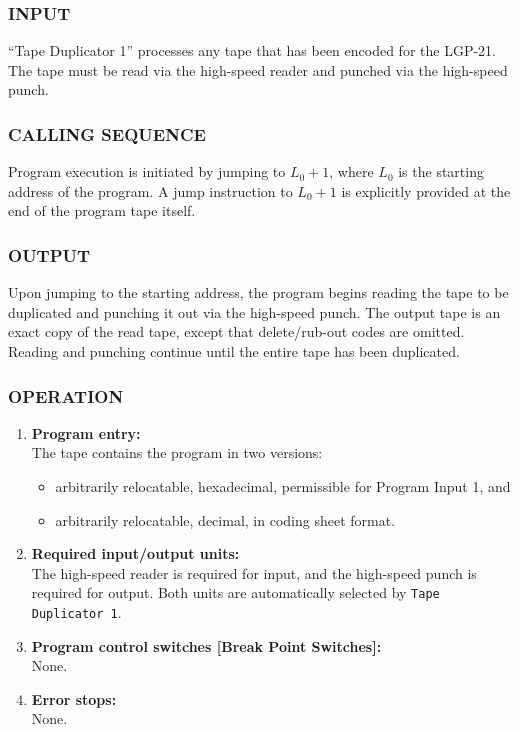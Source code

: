 \subsubsection*{INPUT}
``Tape Duplicator 1'' processes any tape that has been encoded for the LGP-21. The tape must be read via the high-speed reader and punched via the high-speed punch.

\subsubsection*{CALLING SEQUENCE}
Program execution is initiated by jumping to $L_0 + 1$, where $L_0$ is the starting address of the program. A jump instruction to $L_0 + 1$ is explicitly provided at the end of the program tape itself.

\subsubsection*{OUTPUT}
Upon jumping to the starting address, the program begins reading the tape to be duplicated and punching it out via the high-speed punch. The output tape is an exact copy of the read tape, except that delete/rub-out codes are omitted. Reading and punching continue until the entire tape has been duplicated.

\subsubsection*{OPERATION}
\begin{enumerate}
    \item \textbf{Program entry:} \\
    The tape contains the program in two versions:
    \begin{itemize}
        \item[a)] arbitrarily relocatable, hexadecimal, permissible for Program Input 1, and
        \item[b)] arbitrarily relocatable, decimal, in coding sheet format.
    \end{itemize}
    \item \textbf{Required input/output units:} \\
    The high-speed reader is required for input, and the high-speed punch is required for output. Both units are automatically selected by \texttt{Tape Duplicator 1}.
    \item \textbf{Program control switches [Break Point Switches]:} \\
    None.
    \item \textbf{Error stops:} \\
    None.
\end{enumerate}
\newpage
